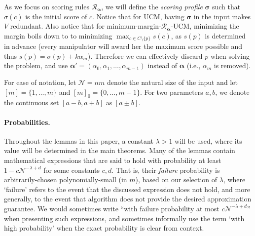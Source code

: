 \documentclass[letterpaper]{article} %
\theoremstyle{definition}
\newcommand{\NN}{\mathcal{N}}
\newcommand\vecgreek{\bm}
\newcommand{\veca}{\vecgreek{\alpha}}
\newcommand{\vecs}{\vecgreek{\sigma}}
\newcommand{\Ra}{\mathcal{R}_{\veca}}
\begin{document}
As we focus on scoring rules $\Ra$, we will define the \emph{scoring profile} $\vecgreek{\sigma}$ such that $\sigma(c)$ is the initial score of $c$. Notice that for UCM, having $\vecs$ in the input makes $V$ redundant. Also notice that for minimum-margin-$\Ra$-UCM, minimizing the margin boils down to to minimizing $\max_{c \in C \setminus \{p\}}s(c) $, as $s(p)$ is determined in advance (every manipulator will award her the maximum score possible and thus $s(p)=\sigma(p)+k\alpha_{m}$). Therefore we can effectively discard $p$ when solving the problem, and use  $\veca' = (\alpha_0,\alpha_1,\ldots,\alpha_{m-1})$ instead of $\veca$ (i.e., $\alpha_m$ is removed).


For ease of notation, let $\NN=nm$ denote the natural size of the input and let $[m]=\{1,\ldots,m\}$ and $[m]_0=\{0,\ldots,m-1\}$. For two parameters $a,b$, we denote the continuous set $[a-b,a+b]$ as $[a \pm b]$.



\paragraph{Probabilities.}
Throughout the lemmas in this paper, a constant $\lambda > 1$ will be used, where its value will be  determined in the main theorems. Many of the lemmas contain mathematical expressions that are said to hold with probability at least $1-c\NN^{-\lambda+d}$ for some constants $c,d$. That is, their \emph{failure} probability is arbitrarily-chosen polynomially-small (in $m$), based on our selection of $\lambda$, where `failure' refers to the event that the discussed expression does not hold, and more generally, to the event that algorithm does not provide the desired approximation guarantee. We would sometimes write ``with failure probability  at most $c\NN^{-\lambda+d}$'' when presenting such expressions, and sometimes informally use the term  `with high probability' when the exact probability is clear from context.
\end{document}
